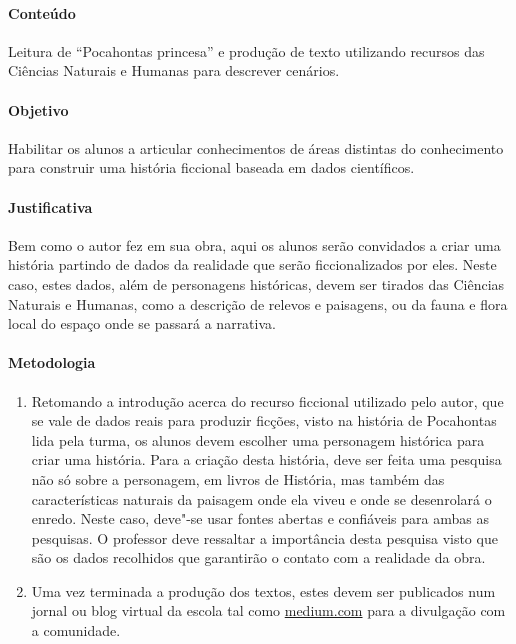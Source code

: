 \documentclass[12pt]{extarticle}
\begin{document}
 \paragraph{Conteúdo} Leitura de ``Pocahontas princesa'' e produção de texto
 utilizando recursos das Ciências Naturais e Humanas para descrever cenários.

 \paragraph{Objetivo} Habilitar os alunos a articular conhecimentos de áreas
 distintas do conhecimento para construir uma história ficcional baseada
 em dados científicos.

 \paragraph{Justificativa} Bem como o autor fez em sua obra, aqui os alunos
 serão convidados a criar uma história partindo de dados da realidade que
 serão ficcionalizados por eles. Neste caso, estes dados, além de personagens
 históricas, devem ser tirados das Ciências Naturais e Humanas, como a descrição de
 relevos e paisagens, ou da fauna e flora local do espaço onde se passará a narrativa.

 \paragraph{Metodologia}
 	\begin{enumerate}
 		\item
 		Retomando a introdução acerca do recurso ficcional utilizado pelo
 		autor, que se vale de dados reais para produzir ficções, visto na história 
 		de Pocahontas lida pela turma, os alunos devem escolher uma personagem 
 		histórica para criar uma história. 
 		Para a criação desta história, deve ser feita uma pesquisa não só sobre
 		a personagem, em livros de História, mas também das características 
 		naturais da paisagem onde ela viveu e onde se desenrolará o enredo.
 		Neste caso, deve"-se usar fontes abertas e confiáveis para ambas as pesquisas.
 		O professor deve ressaltar a importância desta pesquisa visto que são os dados
 		recolhidos que garantirão o contato com a realidade da obra.
 		\item
 		Uma vez terminada a produção dos textos, estes devem ser publicados 
 		num jornal ou blog virtual da escola tal como \url{medium.com} 
 		para a divulgação com a comunidade.

 	\end{enumerate}
\end{document}
